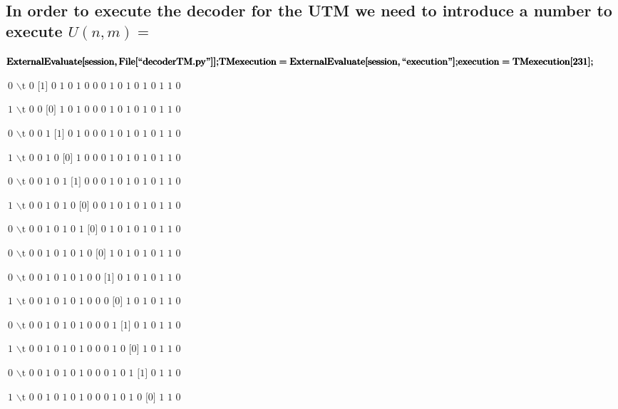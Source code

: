 \documentclass{article}
\begin{document}
\begin{doublespace}
\noindent\(\pmb{\text{}}\)
\end{doublespace}

\subsection*{In order to execute the decoder for the UTM we need to introduce a number to execute \(U(n,m)=\)}

\begin{doublespace}
\noindent\(\pmb{\text{ExternalEvaluate}[\text{session},\text{File}[\text{{``}decoderTM.py{''}}]];}\\
\pmb{\text{TMexecution}=\text{ExternalEvaluate}[\text{session},\text{{``}execution{''}}];}\\
\pmb{\text{execution}=\text{TMexecution}[231];}\)
\end{doublespace}

\noindent\(\text{0 $\backslash $t 0 [1] 0 1 0 1 0 0 0 1 0 1 0 1 0 1 1 0 }\)

\noindent\(\text{1 $\backslash $t 0 0 [0] 1 0 1 0 0 0 1 0 1 0 1 0 1 1 0 }\)

\noindent\(\text{0 $\backslash $t 0 0 1 [1] 0 1 0 0 0 1 0 1 0 1 0 1 1 0 }\)

\noindent\(\text{1 $\backslash $t 0 0 1 0 [0] 1 0 0 0 1 0 1 0 1 0 1 1 0 }\)

\noindent\(\text{0 $\backslash $t 0 0 1 0 1 [1] 0 0 0 1 0 1 0 1 0 1 1 0 }\)

\noindent\(\text{1 $\backslash $t 0 0 1 0 1 0 [0] 0 0 1 0 1 0 1 0 1 1 0 }\)

\noindent\(\text{0 $\backslash $t 0 0 1 0 1 0 1 [0] 0 1 0 1 0 1 0 1 1 0 }\)

\noindent\(\text{0 $\backslash $t 0 0 1 0 1 0 1 0 [0] 1 0 1 0 1 0 1 1 0 }\)

\noindent\(\text{0 $\backslash $t 0 0 1 0 1 0 1 0 0 [1] 0 1 0 1 0 1 1 0 }\)

\noindent\(\text{1 $\backslash $t 0 0 1 0 1 0 1 0 0 0 [0] 1 0 1 0 1 1 0 }\)

\noindent\(\text{0 $\backslash $t 0 0 1 0 1 0 1 0 0 0 1 [1] 0 1 0 1 1 0 }\)

\noindent\(\text{1 $\backslash $t 0 0 1 0 1 0 1 0 0 0 1 0 [0] 1 0 1 1 0 }\)

\noindent\(\text{0 $\backslash $t 0 0 1 0 1 0 1 0 0 0 1 0 1 [1] 0 1 1 0 }\)

\noindent\(\text{1 $\backslash $t 0 0 1 0 1 0 1 0 0 0 1 0 1 0 [0] 1 1 0 }\)
\end{document}
